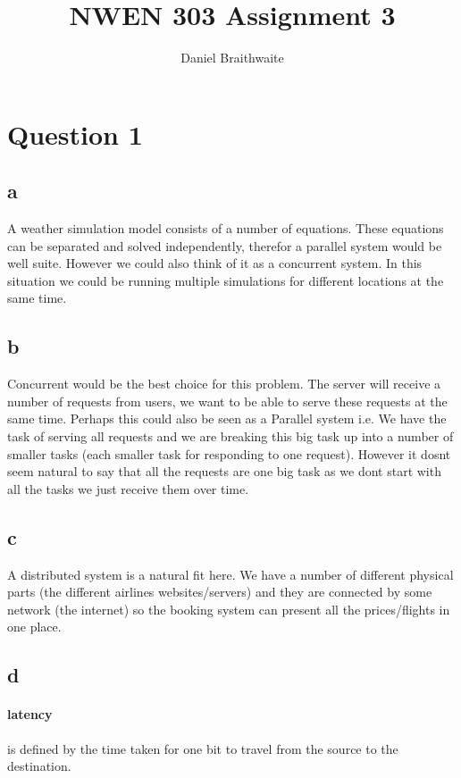 \documentclass[a4paper, 12pt]{article}
\title{NWEN 303 Assignment 3}
\author{Daniel Braithwaite}
\begin{document}
	\maketitle
	\newpage
  	
	\section{Question 1} 
		\subsection{a}
			A weather simulation model consists of a number of equations. These equations can be separated and solved independently, therefor a parallel system would be well suite. However we could also think of it as a concurrent system. In this situation we could be running multiple simulations for different locations at the same time.
		
		\subsection{b}
			Concurrent would be the best choice for this problem. The server will receive a number of requests from users, we want to be able to serve these requests at the same time. Perhaps this could also be seen as a Parallel system i.e. We have the task of serving all requests and we are breaking this big task up into a number of smaller tasks (each smaller task for responding to one request). However it dosnt seem natural to say that all the requests are one big task as we dont start with all the tasks we just receive them over time.
		
		\subsection{c}
			A distributed system is a natural fit here. We have a number of different physical parts (the different airlines websites/servers) and they are connected by some network (the internet) so the booking system can present all the prices/flights in one place.	
		
		\subsection{d}
			\paragraph{latency} is defined by the time taken for one bit to travel from the source to the destination. 
			
\end{document}
